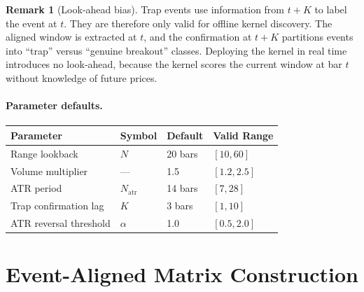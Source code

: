 \documentclass[11pt,a4paper]{article}
\theoremstyle{definition}
\newtheorem{remark}{Remark}[section]
\theoremstyle{plain}
\begin{document}
\begin{remark}[Look-ahead bias]
\label{rem:lookahead}
Trap events use information from $t+K$ to label the event at $t$. They are
therefore only valid for offline kernel discovery. The aligned window is
extracted at $t$, and the confirmation at $t+K$ partitions events into
``trap'' versus ``genuine breakout'' classes. Deploying the kernel in real
time introduces no look-ahead, because the kernel scores the current
window at bar $t$ without knowledge of future prices.
\end{remark}

\paragraph{Parameter defaults.}
\begin{center}
\begin{tabular}{llll}
\hline
\textbf{Parameter} & \textbf{Symbol} & \textbf{Default} & \textbf{Valid Range} \\
\hline
Range lookback           & $N$                   & 20 bars   & $[10, 60]$ \\
Volume multiplier        & ---                   & 1.5       & $[1.2, 2.5]$ \\
ATR period               & $N_{\mathrm{atr}}$    & 14 bars   & $[7, 28]$ \\
Trap confirmation lag    & $K$                   & 3 bars    & $[1, 10]$ \\
ATR reversal threshold   & $\alpha$              & 1.0       & $[0.5, 2.0]$ \\
\hline
\end{tabular}
\end{center}

\section{Event-Aligned Matrix Construction}
\label{sec:matrix}
\end{document}
